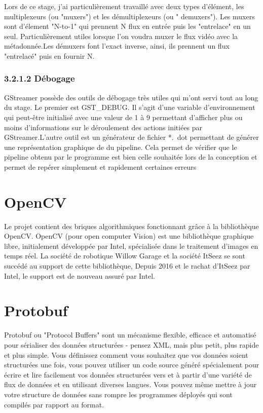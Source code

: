 Lors de ce stage, j'ai particulièrement travaillé avec deux types d'élément, les multiplexeurs (ou "muxers") et les démultiplexeurs (ou " demuxers"). Les muxers sont d'élement "N-to-1" qui prennent N flux en entrée puis les "entrelace" en un seul. Particulièrement utiles lorsque l'on voudra muxer le flux vidéo avec la métadonnée.Les démuxers font l'exact inverse, ainsi, ils prennent un flux "entrelacé" puis en fournir N.


\subsubsection{3.2.1.2 Débogage}
GStreamer possède des outils de débogage très utiles qui m'ont servi tout au long du stage. Le premier est GST\_DEBUG. Il s'agit d'une variable d’environnement qui peut-être initialisé avec une valeur de 1 à 9 permettant d'afficher plus ou moins d'informations sur le déroulement des actions initiées par GStreamer.L'autre outil est un générateur de fichier *. dot permettant de générer une représentation graphique de du pipeline. Cela permet de vérifier que le pipeline obtenu par le programme est bien celle souhaitée lors de la conception et permet de repérer simplement et rapidement certaines erreurs


\section{OpenCV}
Le projet contient des briques algorithmiques fonctionnant grâce à la bibliothèque OpenCV. OpenCV (pour open computer Vision) est une bibliothèque graphique libre, initialement développée par Intel, spécialisée dans le traitement d'images en temps réel. La société de robotique Willow Garage et la société ItSeez se sont succédé au support de cette bibliothèque, Depuis 2016 et le rachat d'ItSeez par Intel, le support est de nouveau assuré par Intel.


\section{Protobuf }
Protobuf ou "Protocol Buffers" sont un mécanisme flexible, efficace et automatisé pour sérialiser des données structurées - pensez XML, mais plus petit, plus rapide et plus simple. Vous définissez comment vous souhaitez que vos données soient structurées une fois, vous pouvez utiliser un code source généré spécialement pour écrire et lire facilement vos données structurées vers et à partir d'une variété de flux de données et en utilisant diverses langues. Vous pouvez même mettre à jour votre structure de données sans rompre les programmes déployés qui sont compilés par rapport au format.

